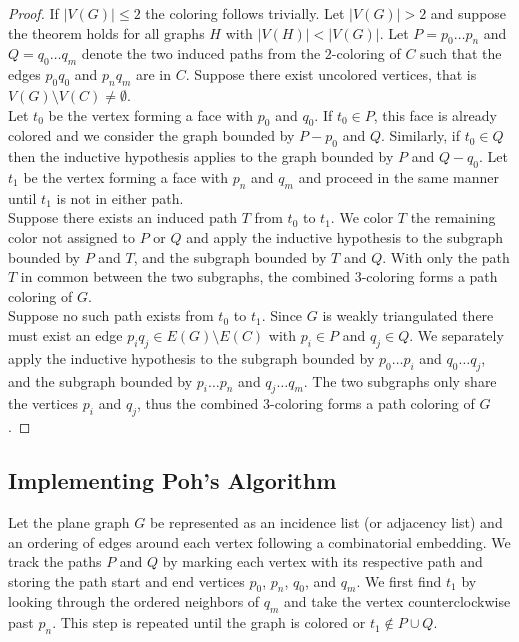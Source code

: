\documentclass[11pt,letter]{article}
\begin{document}
\begin{proof}
\noindent If $|V(G)|\le 2$ the coloring follows trivially. Let $|V(G)|>2$ and suppose the theorem holds
for all graphs $H$ with $|V(H)|<|V(G)|$. Let $P=p_0\ldots p_n$ and $Q=q_0\ldots q_m$ denote the two induced paths from the $2$-coloring of $C$
such that the edges $p_0q_0$ and $p_nq_m$ are in $C$. Suppose there exist uncolored vertices, that is
$V(G)\setminus V(C)\ne\emptyset$.\\

\noindent Let $t_0$ be the vertex forming a face with $p_0$ and $q_0$. If $t_0\in P$, this face is already
colored and we consider the graph bounded by $P-p_0$ and $Q$. Similarly, if $t_0\in Q$ then the inductive
hypothesis applies to the graph bounded by $P$ and $Q-q_0$. Let $t_1$ be the vertex forming a face with $p_n$
and $q_m$ and proceed in the same manner until $t_1$ is not in either path.\\

\noindent Suppose there exists an induced path $T$ from $t_0$ to $t_1$. We color $T$ the remaining color not
assigned to $P$ or $Q$ and apply the inductive hypothesis to the subgraph bounded by $P$ and $T$, and the
subgraph bounded by $T$ and $Q$. With only the path $T$ in common between the two subgraphs, the combined
$3$-coloring forms a path coloring of $G$.\\

\noindent Suppose no such path exists from $t_0$ to $t_1$. Since $G$ is weakly triangulated there must exist an
edge $p_iq_j\in E(G)\setminus E(C)$ with $p_i\in P$ and $q_j\in Q$. We separately apply the inductive hypothesis
to the subgraph bounded by $p_0\ldots p_i$ and $q_0\ldots q_j$, and the subgraph bounded by $p_i\ldots p_n$ and
$q_j\ldots q_m$. The two subgraphs only share the vertices $p_i$ and $q_j$, thus the combined $3$-coloring forms
a path coloring of $G$.
\end{proof}

\subsection*{Implementing Poh's Algorithm}

Let the plane graph $G$ be represented as an incidence list (or adjacency list) and an ordering of edges around
each vertex following a
combinatorial embedding. We track the paths $P$ and $Q$ by marking each vertex with its respective path and
storing the path start and end vertices $p_0$, $p_n$, $q_0$, and $q_m$.
We first find $t_1$ by looking through the ordered neighbors of $q_m$ and take the vertex counterclockwise past
$p_n$. This step is repeated until the graph is colored or $t_1\not\in P\cup Q$.\\
\end{document}

